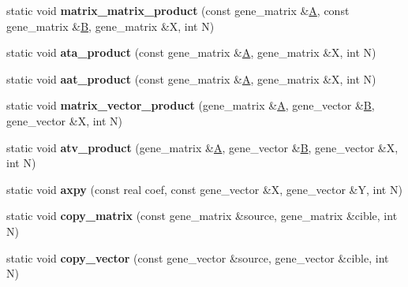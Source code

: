\begin{DoxyCompactItemize}
static void {\bfseries matrix\+\_\+matrix\+\_\+product} (const gene\+\_\+matrix \&\hyperlink{group___core___module_class_eigen_1_1_matrix}{A}, const gene\+\_\+matrix \&\hyperlink{group___core___module_class_eigen_1_1_matrix}{B}, gene\+\_\+matrix \&X, int N)
\item 
\mbox{\label{classblitz__interface_ab0c6a929cabf395e90a7e699fb0780f6}} 
static void {\bfseries ata\+\_\+product} (const gene\+\_\+matrix \&\hyperlink{group___core___module_class_eigen_1_1_matrix}{A}, gene\+\_\+matrix \&X, int N)
\item 
\mbox{\label{classblitz__interface_a315fc012f5b096941c22cd87e3f36f7f}} 
static void {\bfseries aat\+\_\+product} (const gene\+\_\+matrix \&\hyperlink{group___core___module_class_eigen_1_1_matrix}{A}, gene\+\_\+matrix \&X, int N)
\item 
\mbox{\label{classblitz__interface_ac4ee2d4264040c22fda37ab6fdc3218d}} 
static void {\bfseries matrix\+\_\+vector\+\_\+product} (gene\+\_\+matrix \&\hyperlink{group___core___module_class_eigen_1_1_matrix}{A}, gene\+\_\+vector \&\hyperlink{group___core___module_class_eigen_1_1_matrix}{B}, gene\+\_\+vector \&X, int N)
\item 
\mbox{\label{classblitz__interface_a5a4a55988c97500c67bea493f813f221}} 
static void {\bfseries atv\+\_\+product} (gene\+\_\+matrix \&\hyperlink{group___core___module_class_eigen_1_1_matrix}{A}, gene\+\_\+vector \&\hyperlink{group___core___module_class_eigen_1_1_matrix}{B}, gene\+\_\+vector \&X, int N)
\item 
\mbox{\label{classblitz__interface_a1b896d7260ddb53711096374c0491f6c}} 
static void {\bfseries axpy} (const real coef, const gene\+\_\+vector \&X, gene\+\_\+vector \&Y, int N)
\item 
\mbox{\label{classblitz__interface_aca1bec53d9614d9fd7ff2df1a95b7965}} 
static void {\bfseries copy\+\_\+matrix} (const gene\+\_\+matrix \&source, gene\+\_\+matrix \&cible, int N)
\item 
\mbox{\label{classblitz__interface_a8aea6723caaf492cf66f34b7eeff3a55}} 
static void {\bfseries copy\+\_\+vector} (const gene\+\_\+vector \&source, gene\+\_\+vector \&cible, int N)

\end{DoxyCompactItemize}
